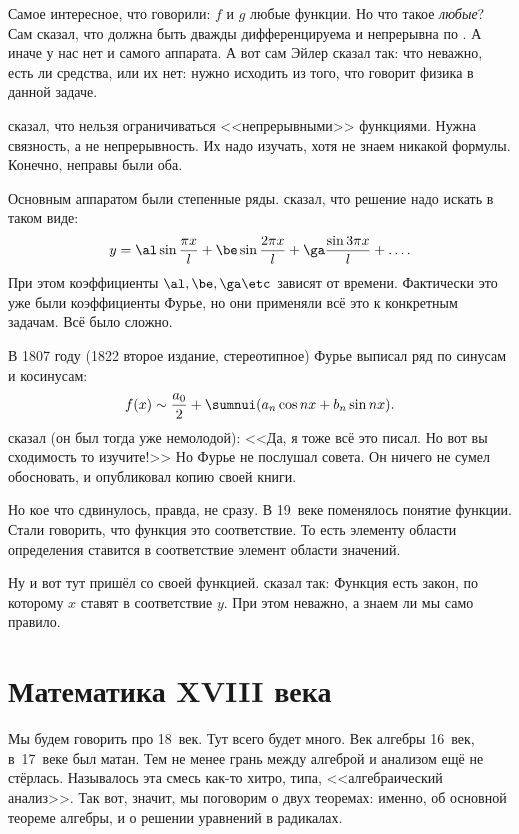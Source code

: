 \documentclass[a4paper,oneside,fleqn,10pt]{article}
\begin{document}
Самое интересное, что говорили: $f$ и $g$ любые функции. Но что такое \emph{любые}?
Сам  сказал, что должна быть дважды дифференцируема и непрерывна по .
А иначе у нас нет и самого аппарата. А вот сам Эйлер сказал так: что неважно,
есть ли средства, или их нет: нужно исходить из того, что говорит физика в данной задаче.

 сказал, что нельзя ограничиваться <<непрерывными>> функциями. Нужна связность,
а не непрерывность. Их надо изучать, хотя не знаем никакой формулы.
Конечно, неправы были оба.

Основным аппаратом были степенные ряды.  сказал, что решение надо искать в таком виде:
$$y = \al \sin \frac{\pi x}{l} + \be \sin \frac{2\pi x}{l} + \ga\frac{\sin 3\pi x}{l}+\ldots.$$
При этом коэффициенты $\al, \be, \ga\etc$ зависят от времени. Фактически это уже были коэффициенты
Фурье, но они применяли всё это к конкретным задачам. Всё было сложно.

В 1807 году (1822 второе издание, стереотипное) Фурье выписал ряд по синусам и косинусам:
$$f(x) \sim \frac{a_0}{2} + \sumnui (a_n \cos nx + b_n \sin nx).$$
 сказал (он был тогда уже немолодой): <<Да, я тоже всё это писал. Но вот вы сходимость то
изучите!>> Но Фурье не послушал совета. Он ничего не сумел обосновать, и опубликовал копию
своей книги.

Но кое что сдвинулось, правда, не сразу. В 19~веке поменялось понятие функции. Стали говорить, что функция
это соответствие. То есть элементу области определения ставится в соответствие элемент области значений.

Ну и вот тут пришёл  со своей функцией.  сказал так:
Функция есть закон, по которому $x$ ставят в соответствие $y$. При этом неважно, а
знаем ли мы само правило.




\section{Математика XVIII века}

Мы будем говорить про 18~век. Тут всего будет много. Век алгебры 16~век,
в~17~веке был матан. Тем не менее грань между алгеброй и анализом
ещё не стёрлась. Называлось эта смесь как-то хитро, типа, <<алгебраический анализ>>.
Так вот, значит, мы поговорим о двух теоремах: именно, об основной теореме алгебры,
и о решении уравнений в радикалах.
\end{document}
